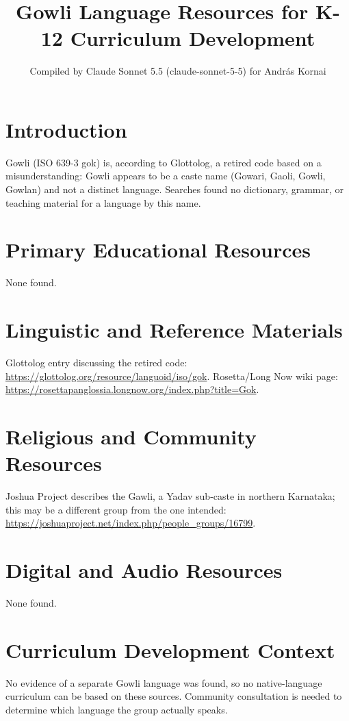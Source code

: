 \documentclass[12pt]{article}
\title{Gowli Language Resources for K-12 Curriculum Development}
\author{Compiled by Claude Sonnet 5.5 (claude-sonnet-5-5) for Andr\'as Kornai}
\date{}
\begin{document}
\maketitle

\section{Introduction}
Gowli (ISO 639-3 gok) is, according to Glottolog, a retired code based on a misunderstanding: Gowli appears to be a caste name (Gowari, Gaoli, Gowli, Gowlan) and not a distinct language. Searches found no dictionary, grammar, or teaching material for a language by this name.

\section{Primary Educational Resources}
None found.

\section{Linguistic and Reference Materials}
Glottolog entry discussing the retired code: \url{https://glottolog.org/resource/languoid/iso/gok}. Rosetta/Long Now wiki page: \url{https://rosettapanglossia.longnow.org/index.php?title=Gok}.

\section{Religious and Community Resources}
Joshua Project describes the Gawli, a Yadav sub-caste in northern Karnataka; this may be a different group from the one intended: \url{https://joshuaproject.net/index.php/people_groups/16799}.

\section{Digital and Audio Resources}
None found.

\section{Curriculum Development Context}
No evidence of a separate Gowli language was found, so no native-language curriculum can be based on these sources. Community consultation is needed to determine which language the group actually speaks.
\end{document}
